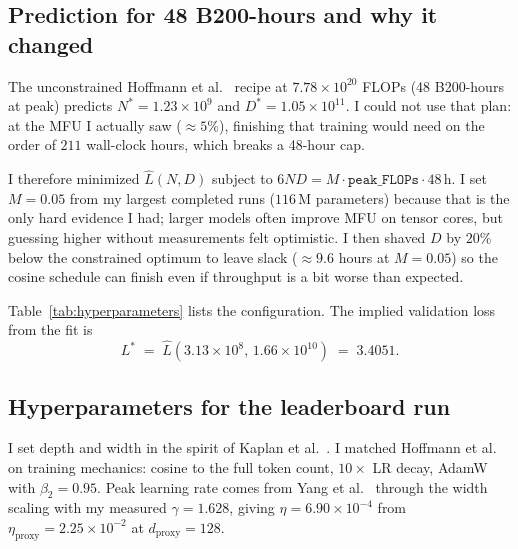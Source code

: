 \documentclass[11pt]{article}
\begin{document}
\subsection{Prediction for 48 B200-hours and why it changed}

The unconstrained Hoffmann et al.~\cite{hoffmann2022} recipe at $7.78 \times 10^{20}$ FLOPs (48 B200-hours at peak) predicts $N^{*} = 1.23 \times 10^{9}$ and $D^{*} = 1.05 \times 10^{11}$. I could not use that plan: at the MFU I actually saw ($\approx 5\%$), finishing that training would need on the order of $211$ wall-clock hours, which breaks a 48-hour cap.

I therefore minimized $\widehat{L}(N, D)$ subject to $6 N D = M \cdot \texttt{peak\_FLOPs} \cdot 48\,\text{h}$. I set $M = 0.05$ from my largest completed runs ($116\,\text{M}$ parameters) because that is the only hard evidence I had; larger models often improve MFU on tensor cores, but guessing higher without measurements felt optimistic. I then shaved $D$ by $20\%$ below the constrained optimum to leave slack ($\approx 9.6$ hours at $M = 0.05$) so the cosine schedule can finish even if throughput is a bit worse than expected.

Table~\ref{tab:hyperparameters} lists the configuration. The implied validation loss from the fit is
\begin{equation}
    L^{*} \;=\; \widehat{L}(3.13 \times 10^{8},\, 1.66 \times 10^{10}) \;=\; 3.4051.
\end{equation}

\subsection{Hyperparameters for the leaderboard run}

I set depth and width in the spirit of Kaplan et al.~\cite{kaplan2020}. I matched Hoffmann et al.~\cite{hoffmann2022} on training mechanics: cosine to the full token count, $10\times$ LR decay, AdamW with $\beta_2 = 0.95$. Peak learning rate comes from Yang et al.~\cite{yang2022} through the width scaling with my measured $\gamma = 1.628$, giving $\eta = 6.90 \times 10^{-4}$ from $\eta_\text{proxy} = 2.25 \times 10^{-2}$ at $d_\text{proxy} = 128$.
\end{document}
